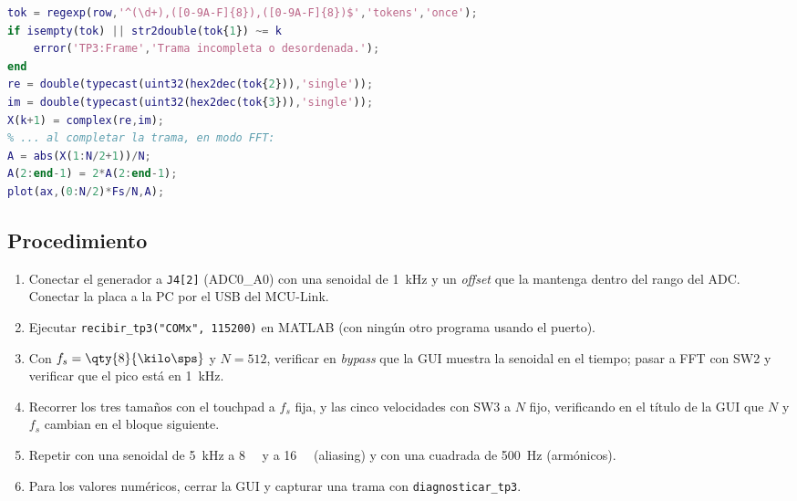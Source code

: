 \documentclass[11pt,a4paper]{article}
\begin{document}
\begin{lstlisting}[language=Matlab,caption={Decodificación de una fila y espectro de un solo lado en \texttt{recibir\_tp3.m}.},label={lst:matlab}]
tok = regexp(row,'^(\d+),([0-9A-F]{8}),([0-9A-F]{8})$','tokens','once');
if isempty(tok) || str2double(tok{1}) ~= k
    error('TP3:Frame','Trama incompleta o desordenada.');
end
re = double(typecast(uint32(hex2dec(tok{2})),'single'));
im = double(typecast(uint32(hex2dec(tok{3})),'single'));
X(k+1) = complex(re,im);
% ... al completar la trama, en modo FFT:
A = abs(X(1:N/2+1))/N;
A(2:end-1) = 2*A(2:end-1);
plot(ax,(0:N/2)*Fs/N,A);
\end{lstlisting}

\label{sec:verificacion}

\subsection{Procedimiento}

\begin{enumerate}[nosep]
  \item Conectar el generador a \texttt{J4[2]} (ADC0\_A0) con una senoidal
        de \qty{1}{\kilo\hertz} y un \emph{offset} que la mantenga dentro
        del rango del ADC. Conectar la placa a la PC por el USB del
        MCU-Link.
  \item Ejecutar \texttt{recibir\_tp3("COMx", 115200)} en MATLAB (con
        ningún otro programa usando el puerto).
  \item Con $f_s = \qty{8}{\kilo\sps}$ y $N = 512$, verificar en
        \emph{bypass} que la GUI muestra la senoidal en el tiempo; pasar a
        FFT con SW2 y verificar que el pico está en \qty{1}{\kilo\hertz}.
  \item Recorrer los tres tamaños con el touchpad a $f_s$ fija, y las cinco
        velocidades con SW3 a $N$ fijo, verificando en el título de la GUI
        que $N$ y $f_s$ cambian en el bloque siguiente.
  \item Repetir con una senoidal de \qty{5}{\kilo\hertz} a
        \qty{8}{\kilo\sps} y a \qty{16}{\kilo\sps} (aliasing) y con una
        cuadrada de \qty{500}{\hertz} (armónicos).
  \item Para los valores numéricos, cerrar la GUI y capturar una trama con
        \texttt{diagnosticar\_tp3}.
\end{enumerate}
\end{document}
